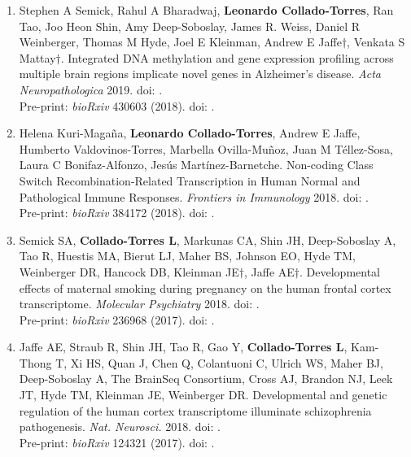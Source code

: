 \begin{enumerate}
        \item Stephen A Semick, Rahul A Bharadwaj, \textbf{Leonardo Collado-Torres}, Ran Tao, Joo Heon Shin, Amy Deep-Soboslay, James R. Weiss, Daniel R Weinberger, Thomas M Hyde, Joel E Kleinman, Andrew E Jaffe$\dagger$, Venkata S Mattay$\dagger$. Integrated DNA methylation and gene expression profiling across multiple brain regions implicate novel genes in Alzheimer's disease. \emph{Acta Neuropathologica} 2019. doi: .
        \\ Pre-print: \emph{bioRxiv} 430603 (2018). doi: .
            
        \item Helena Kuri-Magaña, \textbf{Leonardo Collado-Torres}, Andrew E Jaffe, Humberto Valdovinos-Torres, Marbella Ovilla-Muñoz, Juan M Téllez-Sosa, Laura C Bonifaz-Alfonzo, Jesús Martínez-Barnetche. Non-coding Class Switch Recombination-Related Transcription in Human Normal and Pathological Immune Responses. \emph{Frontiers in Immunology} 2018. doi: .
        \\ Pre-print: \emph{bioRxiv} 384172 (2018). doi: .
        
        \item Semick SA, \textbf{Collado-Torres L}, Markunas CA, Shin JH, Deep-Soboslay A, Tao R, Huestis MA, Bierut LJ, Maher BS, Johnson EO, Hyde TM, Weinberger DR, Hancock DB, Kleinman JE$\dagger$, Jaffe AE$\dagger$. Developmental effects of maternal smoking during pregnancy on the human frontal cortex transcriptome. \emph{Molecular Psychiatry} 2018. doi: .
        \\ Pre-print: \emph{bioRxiv} 236968 (2017). doi: .
        
        \item Jaffe AE, Straub R, Shin JH, Tao R, Gao Y, \textbf{Collado-Torres L}, Kam-Thong T, Xi HS, Quan J, Chen Q, Colantuoni C, Ulrich WS, Maher BJ, Deep-Soboslay A, The BrainSeq Consortium, Cross AJ, Brandon NJ, Leek JT, Hyde TM, Kleinman JE, Weinberger DR. Developmental and genetic regulation of the human cortex transcriptome illuminate schizophrenia pathogenesis. \emph{Nat. Neurosci.} 2018. doi: .
        \\ Pre-print: \emph{bioRxiv} 124321 (2017). doi: .
        

\end{enumerate}
